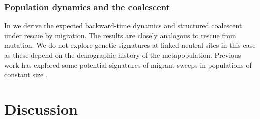 \documentclass[]{article}
\begin{document}
\subsubsection*{Population dynamics and the coalescent}

In  we derive the expected backward-time dynamics and structured coalescent under rescue by migration.
The results are closely analogous to rescue from mutation. 
We do not explore genetic signatures at linked neutral sites in this case as these depend on the demographic history of the metapopulation.
Previous work has explored some potential signatures of migrant sweeps in populations of constant size \citep[e.g.,][]{setter2019volcanofinder}.



\section*{Discussion}
\label{sec:discussion}
\end{document}
